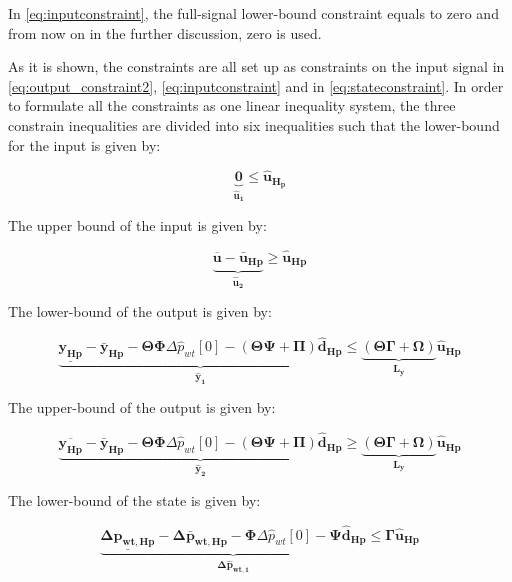 In \eqref{eq:inputconstraint}, the full-signal lower-bound constraint equals to zero and from now on in the further discussion, zero is used.

As it is shown, the constraints are all set up as constraints on the input signal in \eqref{eq:output_constraint2}, \eqref{eq:inputconstraint} and in \eqref{eq:stateconstraint}. In order to formulate all the constraints as one linear inequality system, the three constrain inequalities are divided into six inequalities such that the lower-bound for the input is given by:


\begin{equation}
\underbrace{\bm{0}}_{\bm{\hat{u}_{1}}} \leq \bm{\hat{u}_{H_p}}
\end{equation}


The upper bound of the input is given by:

\begin{equation}
	\underbrace{\overline{\bm{{u}}} - \bm{\bar{u}_{Hp}}}_{\bm{\hat{u}_{2}}} \geq \bm{\hat{u}_{Hp}}
\end{equation}

The lower-bound of the output is given by:

\begin{equation}
\underbrace{\underline{\bm{y_{Hp}}} - \bm{\bar{y}_{Hp}} - \bm{\Theta} \bm{\Phi} \Delta \hat{p}_{wt}[0] - (\bm{\Theta \Psi + \Pi}) \bm{\hat{d}_{Hp}}}_{\bm{\hat{y}_1}} \leq \underbrace{(\bm{\Theta \Gamma + \Omega})}_{\bm{L_y}} \bm{\hat{u}_{Hp}}
\end{equation}

The upper-bound of the output is given by:

\begin{equation}
\underbrace{\overline{\bm{y_{Hp}}} - \bm{\bar{y}_{Hp}} - \bm{\Theta} \bm{\Phi} \Delta \hat{p}_{wt}[0] - (\bm{\Theta \Psi + \Pi}) \bm{\hat{d}_{Hp}}}_{\bm{\hat{y}_2}} \geq \underbrace{(\bm{\Theta \Gamma + \Omega})}_{\bm{L_y}} \bm{\hat{u}_{Hp}}
\end{equation}

The lower-bound of the state is given by:

\begin{equation}
\underbrace{\underline{\bm{\Delta p_{wt,Hp}}} - \bm{\Delta \bar{p}_{wt,Hp}} -  \bm{\Phi} \Delta \hat{p}_{wt}[0] - \bm{\Psi} \bm{\hat{d}_{Hp}}}_{\bm{\Delta \hat{p}_{wt,1}}} \leq \bm{\Gamma} \bm{\hat{u}_{Hp}}
\end{equation}

